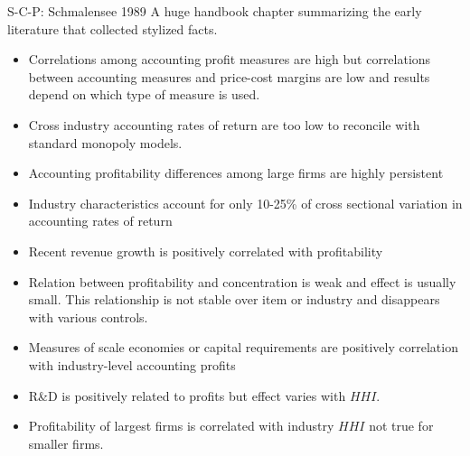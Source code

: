 \documentclass[xcolor=pdftex,dvipsnames,table,mathserif,aspectratio=169]{beamer}
\begin{document}
\begin{frame}{S-C-P: Schmalensee 1989}
A huge handbook chapter summarizing the early literature that collected stylized facts.
\footnotesize
\begin{itemize}
\item Correlations among accounting profit measures are high but correlations between accounting measures and price-cost margins are low and results depend on which type of measure is used.
\item Cross industry accounting rates of return are too low to reconcile with standard monopoly models.
\item Accounting profitability differences among large firms are highly persistent
\item Industry characteristics account for only 10-25\% of cross sectional variation in accounting rates of return
\item Recent revenue growth is positively correlated with profitability
\item Relation between profitability and concentration is weak and effect is usually small. This relationship is not stable over item or industry and disappears with various controls.
\item Measures of scale economies or capital requirements are positively correlation with industry-level accounting profits
\item R\&D is positively related to profits but effect varies with $HHI$.
\item Profitability of largest firms is correlated with industry $HHI$ not true for smaller firms.
\end{itemize}
\end{frame}
\end{document}
